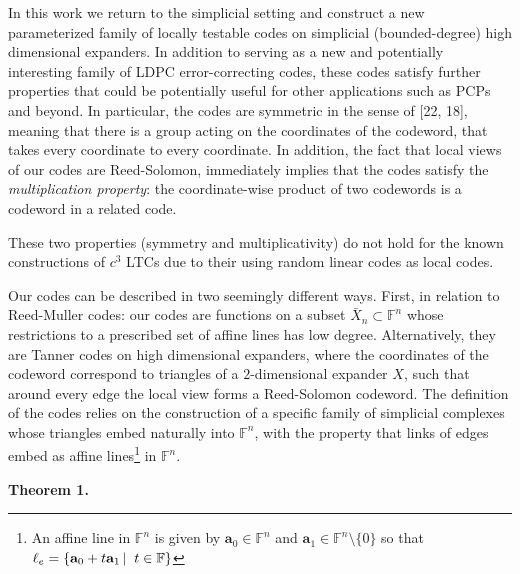\documentclass[10pt,a4paper]{article}
\begin{document}
In this work we return to the simplicial setting and construct a new parameterized family of locally testable codes on simplicial (bounded-degree) high dimensional expanders.
In addition to serving as a new and potentially interesting family of LDPC error-correcting codes, these codes satisfy further properties that could be potentially useful for other applications such as PCPs and beyond. In particular, the codes are symmetric in the sense of [22, 18], meaning that there is a group acting on the coordinates of the codeword, that takes every coordinate to every coordinate. In addition, the fact that local views of our codes are Reed-Solomon, immediately implies that
the codes satisfy the \emph{multiplication property}: the coordinate-wise product of two codewords is a codeword in a related code.\par




These two properties (symmetry and multiplicativity) do not hold for the known constructions of $c^{3}$ LTCs due to their using random linear codes as local codes.\par




Our codes can be described in two seemingly different ways. First, in relation to Reed-Muller codes: our codes are functions on a subset $\bar{X}_{n}\subset\mathbb{F}^{n}$ whose restrictions to a prescribed set of affine lines has low degree. Alternatively, they are Tanner codes on high dimensional expanders, where the coordinates of the codeword correspond to triangles of a $2$-dimensional expander $X$, such that around every edge the local view forms a Reed-Solomon codeword.
The definition of the codes relies on the construction of a specific family of simplicial complexes whose triangles embed naturally into $\mathbb{F}^{n}$, with the property that links of edges embed as affine lines\footnote{An affine line in $\mathbb{F}^{n}$ is given by $\mathbf{a}_{0}\in\mathbb{F}^{n}$ and $\mathbf{a}_{1}\in\mathbb{F}^{n}\setminus\{0\}$ so that $\ell_{e}=\left\{\mathbf{a}_{0}+t\mathbf{a}_{1}\left|\;\vphantom{\mathbf{a}_{0}+t\mathbf{a}_{1}t\in\mathbb{F}}\right.t\in\mathbb{F}\right\}$} in $\mathbb{F}^{n}$.\par





\par\medskip\noindent\textbf{
\textbf{Theorem 1}\textbf{.}
}\par
\end{document}
